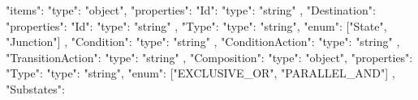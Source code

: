 \documentclass{article}
\begin{document}
{{{{{{{{{{{{                                            "items": {
                                                "type": "object",
                                                "properties": {
                                                    "Id":{
                                                        "type": "string"
                                                    }, 
                                                    "Destination":{
                                                        "properties": {
                                                            "Id": {
                                                                "type": "string"
                                                            },
                                                            "Type": {
                                                                "type": "string",
                                                                "enum": ["State", "Junction"]
                                                            }
                                                        }
                                                    },
                                                    "Condition":{
                                                        "type": "string"
                                                    },
                                                    "ConditionAction":{
                                                        "type": "string"
                                                    },                  
                                                    "TransitionAction":{
                                                        "type": "string"                   
                                                    }                                                                                 
                                                }
                                            }
                                        }                                                                               
                                    }
                                }
                            },                  
                            "Composition":{
                                "type": "object",
                                "properties": {
                                    "Type": {
                                        "type": "string",
                                        "enum": ["EXCLUSIVE_OR", "PARALLEL_AND"]
                                    },
                                    "Substates": {
}}}}}}}}}}}
\end{document}
